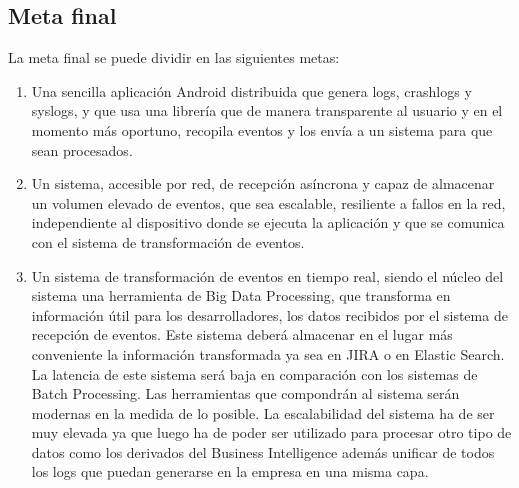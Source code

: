 \subsection{Meta final}
La meta final se puede dividir en las siguientes metas:

\begin{enumerate}
	
	\item Una sencilla aplicación Android distribuida que genera logs, crashlogs y syslogs, y que usa una librería que de manera transparente al usuario y en el momento más oportuno, recopila eventos y los envía a un sistema para que sean procesados. 
	
	\item Un sistema, accesible por red, de recepción asíncrona y capaz de almacenar un volumen elevado de eventos, que sea escalable, resiliente a fallos en la red, independiente al dispositivo donde se ejecuta la aplicación y que se comunica con el sistema de transformación de eventos.
	
	\item Un sistema de transformación de eventos en tiempo real, siendo el núcleo del sistema una herramienta de Big Data Processing, que transforma en información útil para los desarrolladores, los datos recibidos por el sistema de recepción de eventos. Este sistema deberá almacenar en el lugar más conveniente la información transformada ya sea en JIRA o en Elastic Search. La latencia de este sistema será baja en comparación con los sistemas de Batch Processing. Las herramientas que compondrán al sistema serán modernas en la medida de lo posible. La escalabilidad del sistema ha de ser muy elevada ya que luego ha de poder ser utilizado para procesar otro tipo de datos como los derivados del Business Intelligence además unificar de todos los logs que puedan generarse en la empresa en una misma capa.
	
\end{enumerate}





